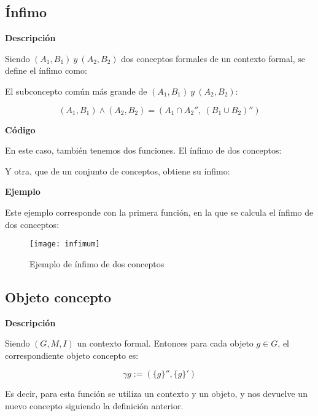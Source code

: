     \subsection{\'Infimo}

    
        \textbf{Descripci\'on}

        Siendo \((A_{1}, B_{1}) ~ y ~ (A_{2}, B_{2})\) dos conceptos formales de un contexto formal, se define el \'infimo como:

        El subconcepto com\'un m\'as grande de \((A_{1}, B_{1}) ~ y ~ (A_{2}, B_{2})\):

        \[ (A_{1}, B_{1}) \wedge (A_{2}, B_{2}) = (A_{1} \cap A_{2}'', ~ (B_{1}\cup B_{2})'') \]

        \clearpage

        \textbf{C\'odigo}

        En este caso, tambi\'en tenemos dos funciones. El \'infimo de dos conceptos:

        

        Y otra, que de un conjunto de conceptos, obtiene su \'infimo:

        

        \bigskip

        \textbf{Ejemplo}

        Este ejemplo corresponde con la primera funci\'on, en la que se calcula el \'infimo de dos conceptos:

        \begin{figure}[H]
            \centering
            \texttt{[image: infimum]}
            \caption{Ejemplo de \'infimo de dos conceptos}
            \label{fig:infimum}
        \end{figure}



    \subsection{Objeto concepto}

    
        \textbf{Descripci\'on}

        Siendo \( (G, M, I) \) un contexto formal. Entonces para cada objeto \( g \in G\), el correspondiente objeto concepto es:

        \[ \gamma g:=(\{g\}'', \{g\}') \]

        Es decir, para esta funci\'on se utiliza un contexto y un objeto, y nos devuelve un nuevo concepto siguiendo la definici\'on 
        anterior.
        \\

